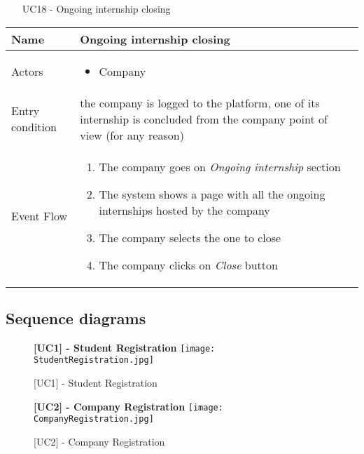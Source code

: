				
				\begin{table} [H]
					\centering
					\begin{itemize}
						\item [UC18] - Ongoing internship closing
					\end{itemize}
					
					\begin{tabular}{|| P{7.5cm} | P{7.5cm} ||}
						\hline
						Name & Ongoing internship closing \\
						\hline
						Actors & \parbox{5cm}{\begin{itemize}
								\item Company
							\end{itemize}
						} \\
						\hline
						Entry condition & the company is logged to the platform, one of its internship is concluded from the company point of view (for any reason)  \\
						\hline
						Event Flow & \parbox{5cm}{\begin{enumerate}
								\item The company goes on \textit{Ongoing internship} section 
								\item The system shows a page with 
								all the ongoing internships hosted by the company  
								\item The company selects the one to close
								\item The company clicks on \textit{Close} button
						\end{enumerate}} \\
						\hline 
					\end{tabular}
				\end{table}
				
		\subsection{Sequence diagrams}
		
			\begin{figure}[H]
				\centering
				{\bfseries [UC1] - Student Registration}
				\texttt{[image: StudentRegistration.jpg]}
				\caption{[UC1] - Student Registration}
			\end{figure}
			
			\begin{figure}[H]
				\centering
				{\bfseries [UC2] - Company Registration}
				\texttt{[image: CompanyRegistration.jpg]}
				\caption{[UC2] - Company Registration}
				
			\end{figure}
			

